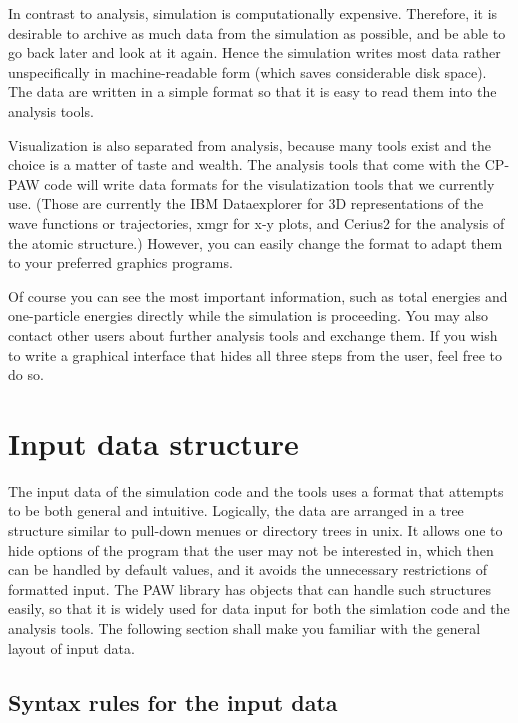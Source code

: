 \documentclass[final,12pt]{article}
\begin{document}
In contrast to analysis, simulation is computationally expensive.
Therefore, it is desirable to archive as much data from the simulation
as possible, and be able to go back later and look at it again. Hence
the simulation writes most data rather unspecifically in machine-readable
form  (which saves considerable disk space).  The data are written in a
simple format so that it is easy to read them into the analysis tools.

Visualization is also separated from analysis, because many tools
exist and the choice is a matter of taste and wealth. The analysis
tools that come with the CP-PAW code will write data formats for the
visulatization tools that we currently use. (Those are currently the
IBM Dataexplorer \cite{Dataexplorer} for 3D representations of the
wave functions or trajectories, xmgr \cite{XMGR} for x-y plots, and
Cerius2 \cite{Cerius2} for the analysis of the atomic structure.)
However, you can easily change the format to adapt them to your
preferred graphics programs.

Of course you can see the most important information, such as total
energies and one-particle energies directly while the simulation is
proceeding. You may also contact other users about further analysis
tools and exchange them. If you wish to write a graphical interface
that hides all three steps from the user, feel free to do so.


\section{Input data structure}
%
The input data of the simulation code and the tools uses a format
that attempts to be both general and intuitive. Logically, the data
are arranged in a tree structure similar to pull-down menues or
directory trees in unix. It allows one to hide options of the program that
the user may not be interested in, which then can be handled by
default values, and it avoids the unnecessary restrictions of formatted
input. The PAW library has objects that can handle such structures
easily, so that it is widely used for data input for both the
simlation code and the analysis tools. The following section shall
make you familiar with the general layout of input data.
%
\subsection{Syntax rules for the input data}
\end{document}
